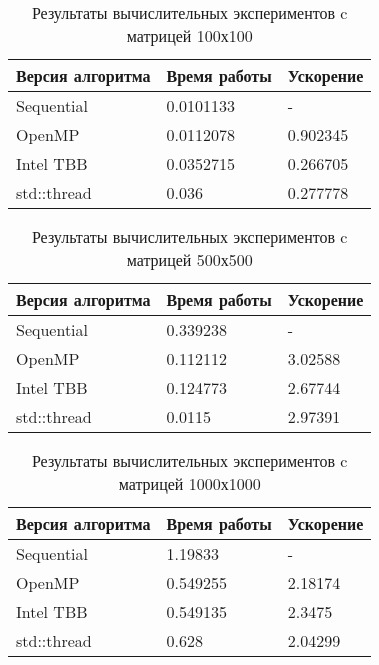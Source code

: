 \documentclass{report}
\begin{document}
\begin{table}[!h]
\caption{Результаты вычислительных экспериментов c матрицей 100х100}
\centering
\begin{tabular}{| p{5cm} | p{5cm} | p{5cm} |}
\hline
Версия алгоритма & Время работы & Ускорение  \\[5pt]
\hline
Sequential      & 0.0101133       & -             \\
OpenMP          & 0.0112078       & 0.902345      \\
Intel TBB       & 0.0352715       & 0.266705      \\
std::thread     & 0.036           & 0.277778      \\
\hline
\end{tabular}
\end{table}

\begin{table}[!h]
\caption{Результаты вычислительных экспериментов c матрицей 500х500}
\centering
\begin{tabular}{| p{5cm} | p{5cm} | p{5cm} |}
\hline
Версия алгоритма & Время работы & Ускорение  \\[5pt]
\hline
Sequential      & 0.339238       & -            \\
OpenMP          & 0.112112       & 3.02588      \\
Intel TBB       & 0.124773       & 2.67744      \\
std::thread     & 0.0115         & 2.97391      \\
\hline
\end{tabular}
\end{table}

\begin{table}[!h]
\caption{Результаты вычислительных экспериментов c матрицей 1000х1000}
\centering
\begin{tabular}{| p{5cm} | p{5cm} | p{5cm} |}
\hline
Версия алгоритма & Время работы & Ускорение  \\[5pt]
\hline
Sequential      & 1.19833       & -            \\
OpenMP          & 0.549255      & 2.18174      \\
Intel TBB       & 0.549135      & 2.3475       \\
std::thread     & 0.628         & 2.04299      \\
\hline
\end{tabular}
\end{table}
\end{document}
